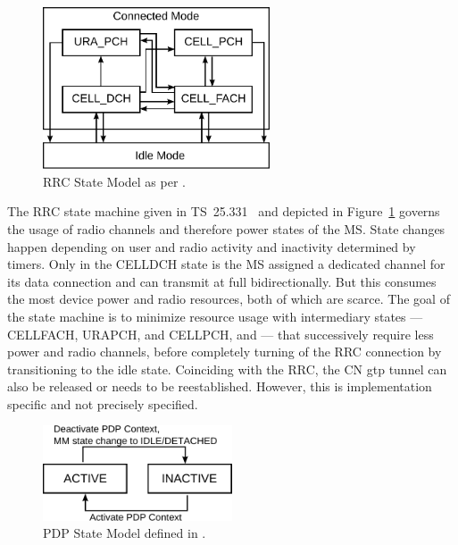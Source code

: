 \begin{figure}[htb] 
	\centering
	\includegraphics[width=0.6\textwidth]{images/rrc-state-model.pdf}
	\caption{\gls{RRC} State Model as per \cite[Section~7.1]{3gpp.25.331}.}
	\label{c4:fig:rrcstatemodel}
\end{figure}

 The \gls{RRC} state machine given in \gls{TS}~25.331~\cite[Section~7.1]{3gpp.25.331} and depicted in Figure~\ref{c4:fig:rrcstatemodel} governs the usage of radio channels and therefore power states of the \gls{MS}. State changes happen depending on user and radio activity and inactivity determined by timers. Only in the \gls{CELLDCH} state is the \gls{MS} assigned a dedicated channel for its data connection and can transmit at full bidirectionally. But this consumes the most device power and radio resources, both of which are scarce. The goal of the state machine is to minimize resource usage with intermediary states --- \gls{CELLFACH}, \gls{URAPCH}, and \gls{CELLPCH}, and  --- that successively require less power and radio channels, before completely turning of the \gls{RRC} connection by transitioning to the idle state. Coinciding with the \gls{RRC}, the \gls{CN} \gls{gtp} tunnel can also be released or needs to be reestablished. However, this is implementation specific and not precisely specified.

\begin{figure}[htb]
	\centering
	\includegraphics[width=0.5\textwidth]{images/pdp-state-model.pdf}
	\caption{\gls{PDP} State Model defined in \cite[Section~9]{3gpp.23.060}.}
\label{c4:fig:pdpstatemodel}
\end{figure}

